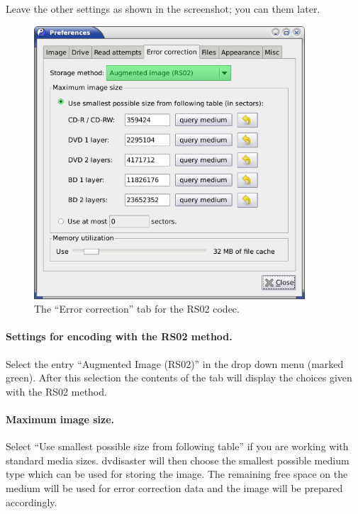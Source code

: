 \smallskip

Leave the other settings as shown in the screenshot; you
can  them later. 

\newpage

\begin{figure}[h]
\centerline{\includegraphics[width=0.9\textwidth]{screenshots/augment-prefs-rs02.png}}
\caption{The ``Error correction'' tab for the RS02 codec.}  
\label{howto-augment-prefs-rs02}
\end{figure}

\vspace*{-3mm}
\paragraph{Settings for encoding with the RS02 method.}\quad

Select the entry ``Augmented Image (RS02)'' in the drop down
menu (marked green). After this selection the contents of the tab
will display the choices given with the RS02 method.

\paragraph{Maximum image size.} Select
``Use smallest possible size from following table'' if you are working
with standard media sizes. dvdisaster will then choose the
smallest possible medium type which can be used for
storing the image. The remaining free space on the medium
will be used for error correction data and the image will
be prepared accordingly.

